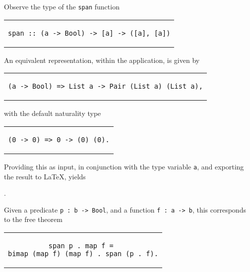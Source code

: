 \documentclass[../Dissertation.tex]{subfiles}
\begin{document}
Observe the type of the \lstinline{span} function
\begin{center}
\begin{tabular}{c}
\begin{lstlisting}
span :: (a -> Bool) -> [a] -> ([a], [a])
\end{lstlisting}
\end{tabular}
\end{center}
An equivalent representation, within the application, is given by
\begin{center}
\begin{tabular}{c}
\begin{lstlisting}
(a -> Bool) => List a -> Pair (List a) (List a),
\end{lstlisting}
\end{tabular}
\end{center}
with the default naturality type
\begin{center}
\begin{tabular}{c}
\begin{lstlisting}
(0 -> 0) => 0 -> (0) (0).
\end{lstlisting}
\end{tabular}
\end{center}
Providing this as input, in conjunction with the type variable \lstinline{a}, and exporting the result to LaTeX, yields
\begin{center}
  .
\end{center}
\noindent
Given a predicate \lstinline{p : b -> Bool}, and a function \lstinline{f : a -> b}, this corresponds to the free theorem
\begin{center}
\begin{tabular}{c}
\begin{lstlisting}
span p . map f = 
bimap (map f) (map f) . span (p . f).
\end{lstlisting}
\end{tabular}
\end{center}
\end{document}
